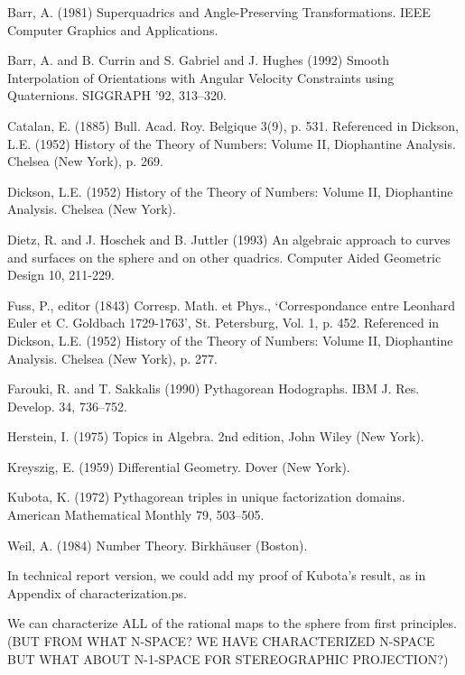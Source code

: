 \documentclass[11pt]{article}
\begin{document}

\begin{thebibliography}{99}

Barr, A. (1981) Superquadrics and Angle-Preserving Transformations.
IEEE Computer Graphics and Applications.

Barr, A. and B. Currin and S. Gabriel and J. Hughes (1992)
Smooth Interpolation of Orientations with Angular Velocity Constraints
using Quaternions.
SIGGRAPH '92, 313--320.

Catalan, E. (1885) Bull. Acad. Roy. Belgique 3(9), p. 531.
Referenced in Dickson, L.E. (1952) History of the Theory of Numbers: Volume II,
Diophantine Analysis.  Chelsea (New York), p. 269.

Dickson, L.E. (1952) History of the Theory of Numbers: Volume II,
Diophantine Analysis.  Chelsea (New York).

Dietz, R. and J. Hoschek and B. Juttler (1993)
An algebraic approach to curves and surfaces on the sphere and
on other quadrics.
Computer Aided Geometric Design 10, 211-229.

Fuss, P., editor (1843) Corresp. Math. et Phys.,
`Correspondance entre Leonhard Euler et C. Goldbach 1729-1763',
St. Petersburg, Vol. 1, p. 452.  
Referenced in Dickson, L.E. (1952) History of the Theory of Numbers: Volume II,
Diophantine Analysis.  Chelsea (New York), p. 277.

Farouki, R. and T. Sakkalis (1990)
Pythagorean Hodographs.
IBM J. Res. Develop. 34, 736--752.

Herstein, I. (1975) Topics in Algebra.
2nd edition, John Wiley (New York).

Kreyszig, E. (1959) Differential Geometry.
Dover (New York).

Kubota, K. (1972) Pythagorean triples in unique factorization domains.
American Mathematical Monthly 79, 503--505.

Weil, A. (1984) Number Theory.
Birkh\"auser (Boston).

\end{thebibliography}

In technical report version, we could add my proof of Kubota's result, 
as in Appendix of characterization.ps.

\clearpage

We can characterize ALL of the rational maps to the sphere from first principles.
(BUT FROM WHAT N-SPACE? WE HAVE CHARACTERIZED N-SPACE BUT WHAT ABOUT N-1-SPACE 
FOR STEREOGRAPHIC PROJECTION?)
\end{document}
